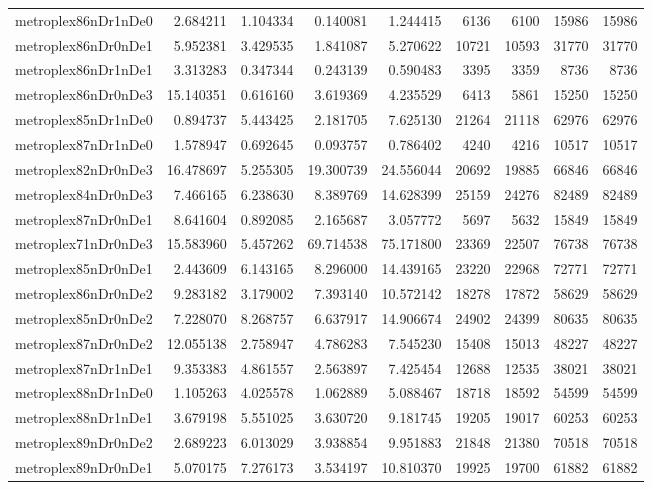 \begin{longtable}{|l|r|r|r|r|r|r|r|r|}
metroplex86nDr1nDe0 & 2.684211 & 1.104334 & 0.140081 & 1.244415 & 6136 & 6100 & 15986 & 15986 \\
metroplex86nDr0nDe1 & 5.952381 & 3.429535 & 1.841087 & 5.270622 & 10721 & 10593 & 31770 & 31770 \\
metroplex86nDr1nDe1 & 3.313283 & 0.347344 & 0.243139 & 0.590483 & 3395 & 3359 & 8736 & 8736 \\
metroplex86nDr0nDe3 & 15.140351 & 0.616160 & 3.619369 & 4.235529 & 6413 & 5861 & 15250 & 15250 \\
metroplex85nDr1nDe0 & 0.894737 & 5.443425 & 2.181705 & 7.625130 & 21264 & 21118 & 62976 & 62976 \\
metroplex87nDr1nDe0 & 1.578947 & 0.692645 & 0.093757 & 0.786402 & 4240 & 4216 & 10517 & 10517 \\
metroplex82nDr0nDe3 & 16.478697 & 5.255305 & 19.300739 & 24.556044 & 20692 & 19885 & 66846 & 66846 \\
metroplex84nDr0nDe3 & 7.466165 & 6.238630 & 8.389769 & 14.628399 & 25159 & 24276 & 82489 & 82489 \\
metroplex87nDr0nDe1 & 8.641604 & 0.892085 & 2.165687 & 3.057772 & 5697 & 5632 & 15849 & 15849 \\
metroplex71nDr0nDe3 & 15.583960 & 5.457262 & 69.714538 & 75.171800 & 23369 & 22507 & 76738 & 76738 \\
metroplex85nDr0nDe1 & 2.443609 & 6.143165 & 8.296000 & 14.439165 & 23220 & 22968 & 72771 & 72771 \\
metroplex86nDr0nDe2 & 9.283182 & 3.179002 & 7.393140 & 10.572142 & 18278 & 17872 & 58629 & 58629 \\
metroplex85nDr0nDe2 & 7.228070 & 8.268757 & 6.637917 & 14.906674 & 24902 & 24399 & 80635 & 80635 \\
metroplex87nDr0nDe2 & 12.055138 & 2.758947 & 4.786283 & 7.545230 & 15408 & 15013 & 48227 & 48227 \\
metroplex87nDr1nDe1 & 9.353383 & 4.861557 & 2.563897 & 7.425454 & 12688 & 12535 & 38021 & 38021 \\
metroplex88nDr1nDe0 & 1.105263 & 4.025578 & 1.062889 & 5.088467 & 18718 & 18592 & 54599 & 54599 \\
metroplex88nDr1nDe1 & 3.679198 & 5.551025 & 3.630720 & 9.181745 & 19205 & 19017 & 60253 & 60253 \\
metroplex89nDr0nDe2 & 2.689223 & 6.013029 & 3.938854 & 9.951883 & 21848 & 21380 & 70518 & 70518 \\
metroplex89nDr0nDe1 & 5.070175 & 7.276173 & 3.534197 & 10.810370 & 19925 & 19700 & 61882 & 61882 \\

\end{longtable}
